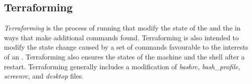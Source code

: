 \subsection{Terraforming}\label{terraform}\label{terraforms}\label{terraforming}

\emph{Terraforming} is the process of running  that modify the state of the  and the  in ways that make additional commands found. Terraforming is also intended to modify the state change caused by a set of commands favourable to the interests of an . Terraforming also ensures the states of the machine and the shell after a restart. Terraforming generally includes a modification of \emph{bashrc}, \emph{bash\_profile}, \emph{screenrc}, and \emph{desktop} files.